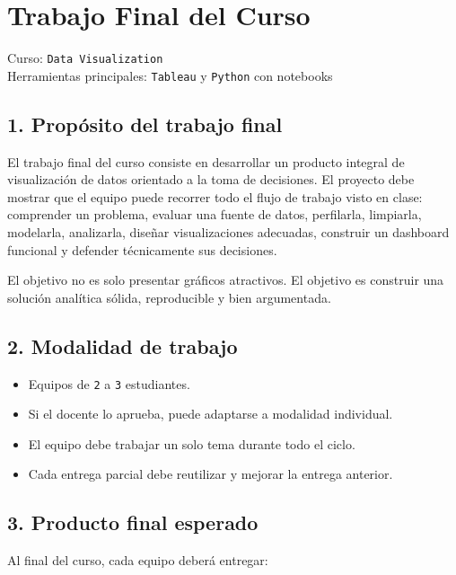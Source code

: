 \documentclass[
]{article}
\author{}
\date{}
\providecommand{\tightlist}{%
  \setlength{\itemsep}{0pt}\setlength{\parskip}{0pt}}
\begin{document}
{
\setcounter{tocdepth}{3}
\tableofcontents
}
\section{Trabajo Final del Curso}\label{trabajo-final-del-curso}

Curso: \texttt{Data\ Visualization}\\
Herramientas principales: \texttt{Tableau} y \texttt{Python} con
notebooks

\subsection{1. Propósito del trabajo
final}\label{1-propuxf3sito-del-trabajo-final}

El trabajo final del curso consiste en desarrollar un producto integral
de visualización de datos orientado a la toma de decisiones. El proyecto
debe mostrar que el equipo puede recorrer todo el flujo de trabajo visto
en clase: comprender un problema, evaluar una fuente de datos,
perfilarla, limpiarla, modelarla, analizarla, diseñar visualizaciones
adecuadas, construir un dashboard funcional y defender técnicamente sus
decisiones.

El objetivo no es solo presentar gráficos atractivos. El objetivo es
construir una solución analítica sólida, reproducible y bien
argumentada.

\subsection{2. Modalidad de trabajo}\label{2-modalidad-de-trabajo}

\begin{itemize}
\tightlist
\item
  Equipos de \texttt{2} a \texttt{3} estudiantes.
\item
  Si el docente lo aprueba, puede adaptarse a modalidad individual.
\item
  El equipo debe trabajar un solo tema durante todo el ciclo.
\item
  Cada entrega parcial debe reutilizar y mejorar la entrega anterior.
\end{itemize}

\subsection{3. Producto final esperado}\label{3-producto-final-esperado}

Al final del curso, cada equipo deberá entregar:
\end{document}

